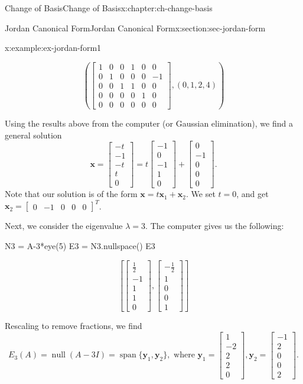 \documentclass[oneside,10pt,]{book}
\numberwithin{equation}{section}
\newcommand{\spn}{\operatorname{span}}
\newcommand{\bbm}{\begin{bmatrix}}
\newcommand{\ebm}{\end{bmatrix}}
\newcommand{\nll}{\operatorname{null}}
\newcommand{\xx}{\mathbf{x}}
\newcommand{\yy}{\mathbf{y}}
\newcommand{\amp}{&}
\begin{document}
\begin{chapterptx}{Change of Basis}{}{Change of Basis}{}{}{x:chapter:ch-change-basis}
\begin{sectionptx}{Jordan Canonical Form}{}{Jordan Canonical Form}{}{}{x:section:sec-jordan-form}
\begin{example}{}{x:example:ex-jordan-form1}
\begin{sageoutput}
\[\left(\bbm 1\amp 0\amp 0 \amp 1\amp 0\amp 0\\0\amp 1\amp 0\amp 0\amp 0\amp -1\\0\amp 0\amp 1\amp 1\amp 0\amp 0\\
0\amp 0\amp 0\amp 0\amp 1\amp 0\\0\amp 0\amp 0\amp 0\amp 0\amp 0\ebm,(0,1,2,4)\right)\]
\end{sageoutput}
Using the results above from the computer (or Gaussian elimination), we find a general solution%
\begin{equation*}
\xx = \bbm -t\\-1\\-t\\t\\0\ebm = t\bbm -1\\0\\-1\\1\\0\ebm + \bbm 0\\-1\\0\\0\\0\ebm\text{.}
\end{equation*}
Note that our solution is of the form \(\xx = t\xx_1+\xx_2\). We set \(t=0\), and get \(\xx_2 = \bbm 0\amp -1\amp 0\amp 0\amp 0\ebm^T\).%
\par
Next, we consider the eigenvalue \(\lambda=3\). The computer gives us the following:%
\begin{sageinput}
N3 = A-3*eye(5)
E3 = N3.nullspace()
E3
\end{sageinput}
\begin{sageoutput}
\[\left[\bbm \frac12\\-1\\1\\1\\0\ebm, \bbm -\frac12\\1\\0\\0\\1\ebm\right]\]
\end{sageoutput}
Rescaling to remove fractions, we find%
\begin{equation*}
E_3(A) = \nll(A-3I) = \spn\{\yy_1,\yy_2\}, \text{ where } \yy_1 = \bbm 1\\-2\\2\\2\\0\ebm, \yy_2 = \bbm -1\\2\\0\\0\\2\ebm\text{.}

\end{equation*}
\end{example}
\end{sectionptx}
\end{chapterptx}
\end{document}
